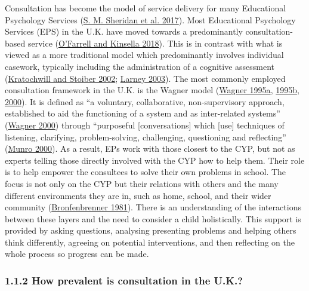 \documentclass[
]{article}
\begin{document}
Consultation has become the model of service delivery for many
Educational Psychology Services
(\protect\hyperlink{ref-sheridanRandomizedTrialExamining2017}{S. M.
Sheridan et al. 2017}). Most Educational Psychology Services (EPS) in
the U.K. have moved towards a predominantly consultation-based service
(\protect\hyperlink{ref-ofarrellResearchExploringParents2018}{O'Farrell
and Kinsella 2018}). This is in contrast with what is viewed as a more
traditional model which predominantly involves individual casework,
typically including the administration of a cognitive assessment
(\protect\hyperlink{ref-kratochwillEvidenceBasedInterventionsSchool2002}{Kratochwill
and Stoiber 2002};
\protect\hyperlink{ref-larneySchoolBasedConsultationUnited2003}{Larney
2003}). The most commonly employed consultation framework in the U.K. is
the Wagner model
(\protect\hyperlink{ref-wagnerConsultationApproachEducational1995}{Wagner
1995a},
\protect\hyperlink{ref-wagnerSchoolConsultationFrameworks1995}{1995b},
\protect\hyperlink{ref-wagnerConsultationDevelopingComprehensive2000}{2000}).
It is defined as ``a voluntary, collaborative, non-supervisory approach,
established to aid the functioning of a system and as inter-related
systems''
(\protect\hyperlink{ref-wagnerConsultationDevelopingComprehensive2000}{Wagner
2000}) through ``purposeful {[}conversations{]} which {[}use{]}
techniques of listening, clarifying, problem-solving, challenging,
questioning and reflecting''
(\protect\hyperlink{ref-munroAnglesDevelopingConsultation2000}{Munro
2000}). As a result, EPs work with those closest to the CYP, but not as
experts telling those directly involved with the CYP how to help them.
Their role is to help empower the consultees to solve their own problems
in school. The focus is not only on the CYP but their relations with
others and the many different environments they are in, such as home,
school, and their wider community
(\protect\hyperlink{ref-bronfenbrennerEcologyHumanDevelopment1981}{Bronfenbrenner
1981}). There is an understanding of the interactions between these
layers and the need to consider a child holistically. This support is
provided by asking questions, analysing presenting problems and helping
others think differently, agreeing on potential interventions, and then
reflecting on the whole process so progress can be made.

\hypertarget{how-prevalent-is-consultation-in-the-u.k.}{%
\subsubsection{1.1.2 How prevalent is consultation in the
U.K.?}\label{how-prevalent-is-consultation-in-the-u.k.}}
\end{document}
